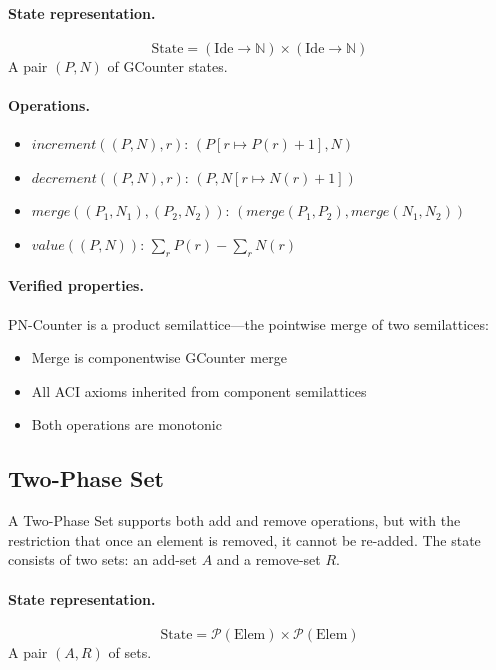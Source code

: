 \paragraph{State representation.}
\[
\text{State} = (\text{Ide} \to \mathbb{N}) \times (\text{Ide} \to \mathbb{N})
\]
A pair $(P, N)$ of GCounter states.

\paragraph{Operations.}
\begin{itemize}
  \item $\mathit{increment}((P, N), r)$: $(P[r \mapsto P(r)+1], N)$
  \item $\mathit{decrement}((P, N), r)$: $(P, N[r \mapsto N(r)+1])$
  \item $\mathit{merge}((P_1, N_1), (P_2, N_2))$: $(\mathit{merge}(P_1, P_2), \mathit{merge}(N_1, N_2))$
  \item $\mathit{value}((P, N))$: $\sum_r P(r) - \sum_r N(r)$
\end{itemize}

\paragraph{Verified properties.}
PN-Counter is a product semilattice—the pointwise merge of two semilattices:
\begin{itemize}
  \item Merge is componentwise GCounter merge
  \item All ACI axioms inherited from component semilattices
  \item Both operations are monotonic
\end{itemize}

\subsection{Two-Phase Set}

A Two-Phase Set supports both add and remove operations, but with the restriction that once an element is removed, it cannot be re-added. The state consists of two sets: an add-set $A$ and a remove-set $R$.

\paragraph{State representation.}
\[
\text{State} = \mathcal{P}(\text{Elem}) \times \mathcal{P}(\text{Elem})
\]
A pair $(A, R)$ of sets.

